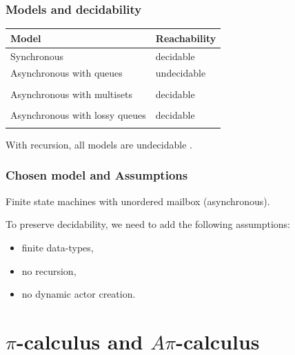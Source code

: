 \documentclass{beamer}
\begin{document}
\begin{frame}
  \frametitle{Models and decidability}

\begin{tabular}{l|l}
Model & Reachability\\
\hline
\hline
Synchronous & decidable \\
\hline
Asynchronous with queues & undecidable\\
 & \cite{DBLP:journals/jacm/BrandZ83} \\
\hline
Asynchronous with multisets  & decidable\footnotemark \\
& \cite{DBLP:journals/njc/AmadioM02} \\
\hline
Asynchronous with lossy queues & decidable\footnotemark \\
& \cite{DBLP:journals/iandc/AbdullaJ96} \\
\hline
\end{tabular}

\vspace{20pt}

With recursion, all models are undecidable \cite{DBLP:journals/toplas/Ramalingam00}.


\end{frame}

\begin{frame}
  \frametitle{Chosen model and Assumptions}

  Finite state machines with unordered mailbox (asynchronous).

  \vspace{20pt}

  To preserve decidability, we need to add the following assumptions:
  \begin{itemize}
  \item finite data-types,
  \item no recursion,
  \item no dynamic actor creation.
  \end{itemize}
\end{frame}

\section{$\pi$-calculus and $A\pi$-calculus}
\end{document}
